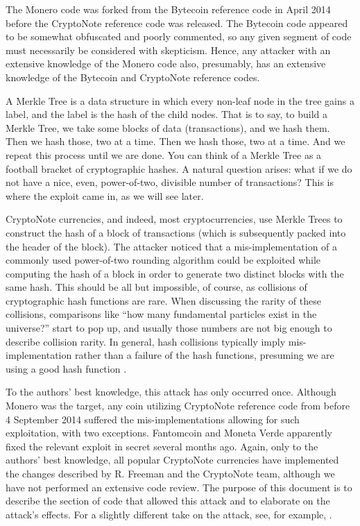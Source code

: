 \documentclass{mrl}
\begin{document}
The Monero code was forked from the Bytecoin reference code in April 2014 before the CryptoNote reference code was released. The Bytecoin code appeared to be somewhat obfuscated and poorly commented, so any given segment of code must necessarily be considered with skepticism. Hence, any attacker with an extensive knowledge of the Monero code also, presumably, has an extensive knowledge of the Bytecoin and CryptoNote reference codes.

A Merkle Tree is a data structure in which every non-leaf node in the tree gains a label, and the label is the hash of the child nodes\cite{merkle1988digital}. That is to say, to build a Merkle Tree, we take some blocks of data (transactions), and we hash them. Then we hash those, two at a time. Then we hash those, two at a time. And we repeat this process until we are done. You can think of a Merkle Tree as a football bracket of cryptographic hashes. A natural question arises: what if we do not have a nice, even, power-of-two, divisible number of transactions? This is where the exploit came in, as we will see later.

CryptoNote currencies, and indeed, most cryptocurrencies, use Merkle Trees to construct the hash of a block of transactions (which is subsequently packed into the header of the block). The attacker noticed that a mis-implementation of a commonly used power-of-two rounding algorithm could be exploited while computing the hash of a block in order to generate two distinct blocks with the same hash. This should be all but impossible, of course, as collisions of cryptographic hash functions are rare. When discussing the rarity of these collisions, comparisons like ``how many fundamental particles exist in the universe?'' start to pop up, and usually those numbers are not big enough to describe collision rarity. In general, hash collisions typically imply mis-implementation rather than a failure of the hash functions, presuming we are using a good hash function \cite{anderson1993classification}.

To the authors' best knowledge, this attack has only occurred once. Although Monero was the target, any coin utilizing CryptoNote reference code from before 4 September 2014 suffered the mis-implementations allowing for such exploitation, with two exceptions. Fantomcoin and Moneta Verde apparently fixed the relevant exploit in secret several months ago. Again, only to the authors' best knowledge, all popular CryptoNote currencies have implemented the changes described by R. Freeman and the CryptoNote team, although we have not performed an extensive code review. The purpose of this document is to describe the section of code that allowed this attack and to elaborate on the attack's effects. For a slightly different take on the attack, see, for example, \cite{CryptoNote:2014}.
\end{document}
